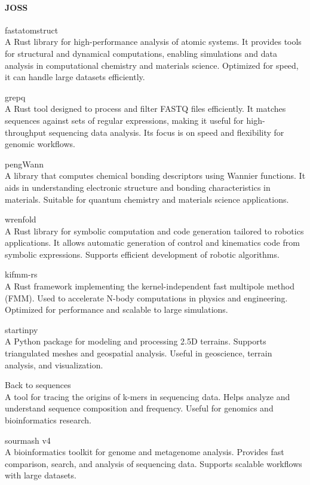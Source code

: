 \documentclass{article}
\begin{document}
\paragraph{JOSS}

fastatomstruct\\
A Rust library for high-performance analysis of atomic systems. It provides tools
for structural and dynamical computations, enabling simulations and data analysis in computational
chemistry and materials science. Optimized for speed, it can handle large datasets efficiently.

grepq\\
A Rust tool designed to process and filter FASTQ files efficiently. It matches sequences
against sets of regular expressions, making it useful for high-throughput sequencing data analysis.
Its focus is on speed and flexibility for genomic workflows.

pengWann\\
A library that computes chemical bonding descriptors using Wannier functions. It aids in
understanding electronic structure and bonding characteristics in materials. Suitable for quantum
chemistry and materials science applications.

wrenfold\\
A Rust library for symbolic computation and code generation tailored to robotics
applications. It allows automatic generation of control and kinematics code from symbolic
expressions. Supports efficient development of robotic algorithms.

kifmm-rs\\
A Rust framework implementing the kernel-independent fast multipole method (FMM). Used
to accelerate N-body computations in physics and engineering. Optimized for performance and
scalable to large simulations.

startinpy\\
A Python package for modeling and processing 2.5D terrains. Supports triangulated
meshes and geospatial analysis. Useful in geoscience, terrain analysis, and visualization.

Back to sequences\\
A tool for tracing the origins of k-mers in sequencing data. Helps analyze and
understand sequence composition and frequency. Useful for genomics and bioinformatics research.

sourmash v4\\
A bioinformatics toolkit for genome and metagenome analysis. Provides fast
comparison, search, and analysis of sequencing data. Supports scalable workflows with large
datasets.
\end{document}
